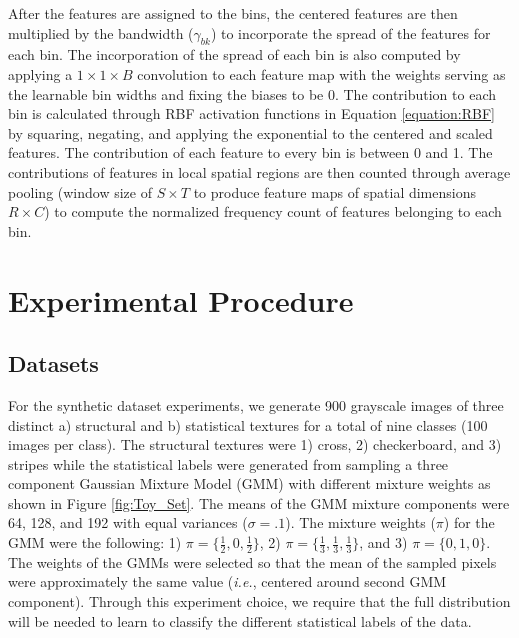 \documentclass[journal]{IEEEtai}
\begin{document}
	After the features are assigned to the bins, the centered features are then multiplied by the bandwidth ($\gamma_{bk}$) to incorporate the spread of the features for each bin. The incorporation of the spread of each bin is also computed by applying a $1 \times 1 \times B$ convolution to each feature map with the weights serving as the learnable bin widths and fixing the biases to be 0.  The contribution to each bin is calculated through RBF activation functions in Equation \ref{equation:RBF} by squaring, negating, and applying the exponential to the centered and scaled features. The contribution of each feature to every bin is between 0 and 1. The contributions of features in local spatial regions are then counted through average pooling (window size of $S \times T$ to produce feature maps of spatial dimensions $R \times C$) to compute the normalized frequency count of features belonging to each bin.

\section{Experimental Procedure}
	\subsection{Datasets} \label{sect:datasets}
	For the synthetic dataset experiments, we generate 900 grayscale images of three distinct a) structural and b) statistical textures for a total of nine classes (100 images per class). The structural textures were 1) cross, 2) checkerboard, and 3) stripes while the statistical labels were generated from sampling a three component Gaussian Mixture Model (GMM) with different mixture weights as shown in Figure \mbox{\ref{fig:Toy_Set}}. The means of the GMM mixture components were 64, 128, and 192 with equal variances ($\sigma = .1$). The mixture weights ($\pi$) for the GMM were the following: 1) $\pi = \{\frac{1}{2}, 0, \frac{1}{2}\}$, 2) $\pi = \{\frac{1}{3}, \frac{1}{3}, \frac{1}{3}\}$, and 3) $\pi = \{0, 1, 0\}$. The weights of the GMMs were selected so that the mean of the sampled pixels were approximately the same value (\textit{i.e.}, centered around second GMM component). Through this experiment choice, we require that the full distribution will be needed to learn to classify the different statistical labels of the data.
	
\end{document}
